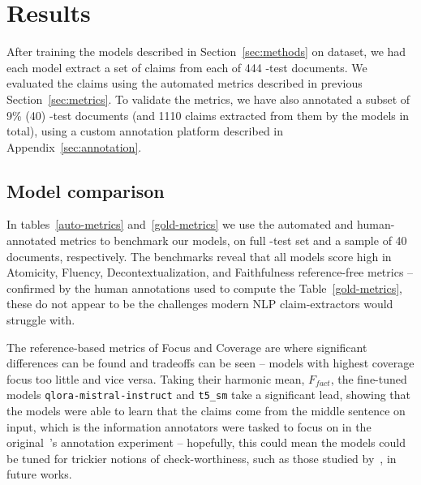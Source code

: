 \section{Results}\label{sec:results}

After training the models described in Section~\ref{sec:methods} on \ds{} dataset, we had each model extract a set of claims from each of 444 \ds{}-test documents.
We evaluated the claims using the automated metrics described in previous Section~\ref{sec:metrics}.
To validate the metrics, we have also annotated a subset of 9\% (40) \ds{}-test documents (and 1110 claims extracted from them by the models in total), using a custom annotation platform described in Appendix~\ref{sec:annotation}.


\subsection{Model comparison}
In tables~\ref{auto-metrics} and~\ref{gold-metrics} we use the automated and human-annotated metrics to benchmark our models, on full \ds{}-test set and a sample of 40 documents, respectively.
The benchmarks reveal that all models score high in Atomicity, Fluency, Decontextualization, and Faithfulness reference-free metrics -- confirmed by the human annotations used to compute the Table~\ref{gold-metrics}, these do not appear to be the challenges modern NLP claim-extractors would struggle with.

The reference-based metrics of Focus and Coverage are where significant differences can be found and tradeoffs can be seen -- models with highest coverage focus too little and vice versa. 
Taking their harmonic mean, $F_{fact}$, the fine-tuned models \texttt{qlora-mistral-instruct} and \texttt{t5\_sm} take a significant lead, showing that the models were able to learn that the \ds{} claims come from the middle sentence on input, which is the information annotators were tasked to focus on in the original~\citealt{thorne-etal-2018-fever}'s annotation experiment -- hopefully, this could mean the models could be tuned for trickier notions of check-worthiness, such as those studied by~\citealt{10.1007/978-3-031-28241-6_59}, in future works.


